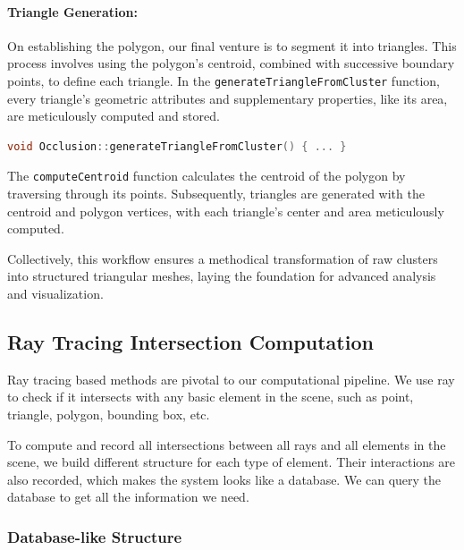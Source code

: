 \documentclass[11pt, a4paper,oneside,chapterprefix=false]{scrbook}
\begin{document}
\paragraph{Triangle Generation:} On establishing the polygon, our final venture is to segment it into triangles. This process involves using the polygon's centroid, combined with successive boundary points, to define each triangle. In the \texttt{generateTriangleFromCluster} function, every triangle's geometric attributes and supplementary properties, like its area, are meticulously computed and stored.

\begin{lstlisting}[language=C++, caption=Triangle Generation from Polygons]
void Occlusion::generateTriangleFromCluster() { ... }
\end{lstlisting}

The \texttt{computeCentroid} function calculates the centroid of the polygon by traversing through its points. Subsequently, triangles are generated with the centroid and polygon vertices, with each triangle's center and area meticulously computed.

Collectively, this workflow ensures a methodical transformation of raw clusters into structured triangular meshes, laying the foundation for advanced analysis and visualization.


\subsection{Ray Tracing Intersection Computation} \label{sec:ray tracing}

Ray tracing based methods are pivotal to our computational pipeline. We use ray to check if it intersects with any basic element in the scene, such as point, triangle, polygon, bounding box, etc.

To compute and record all intersections between all rays and all elements in the scene, we build different structure for each type of element. Their interactions are also recorded, which makes the system looks like a database. We can query the database to get all the information we need.  

\subsubsection{Database-like Structure}
\end{document}
